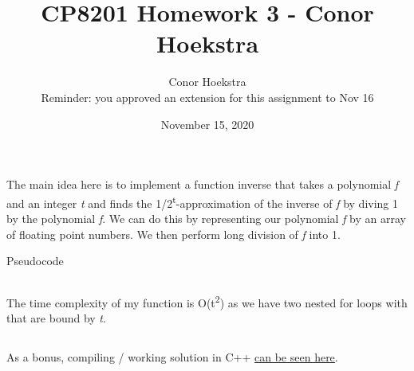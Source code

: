 \documentclass{article}
\title{CP8201 Homework 3 - Conor Hoekstra}
\author{Conor Hoekstra\\Reminder: you approved an extension for this assignment to Nov 16}
\date{November 15, 2020}
\newlength\myindent
\newcommand\bindent{%
  \begingroup
  \setlength{\itemindent}{\myindent}
  \addtolength{\algorithmicindent}{\myindent}
}
\newcommand\eindent{\endgroup}
\begin{document}
\maketitle

\section{}

\subsection{}

The main idea here is to implement a function inverse that takes a polynomial \textit{f} and an integer \textit{t} and finds the 1/2\textsuperscript{t}-approximation of the inverse of \textit{f} by diving 1 by the polynomial \textit{f}. We can do this by representing our polynomial \textit{f} by an array of floating point numbers. We then perform long division of \textit{f} into 1.

\begin{algorithm}
\begin{algorithmic}
        \bindent
            \ENDFOR
        \ENDFOR
        \eindent
\end{algorithmic}
\caption{Pseudocode}
\label{alg:example}
\end{algorithm}

\subsection{}
The time complexity of my function is O(t\textsuperscript{2}) as we have two nested for loops with that are bound by \textit{t}.

\subsection{}
As a bonus, compiling / working solution in C++ \underline{\href{https://www.godbolt.org/z/bfccob}{can be seen here}}.
\end{document}
